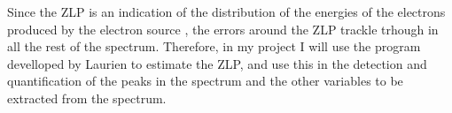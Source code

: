 Since the ZLP is an indication of the distribution of the energies of the electrons produced by the electron source \cite{egerton_article}, the errors around the ZLP trackle trhough in all the rest of the spectrum. Therefore, in my project I will use the program develloped by Laurien to estimate the ZLP, and use this in the detection and quantification of the peaks in the spectrum and the other variables to be extracted from the spectrum.